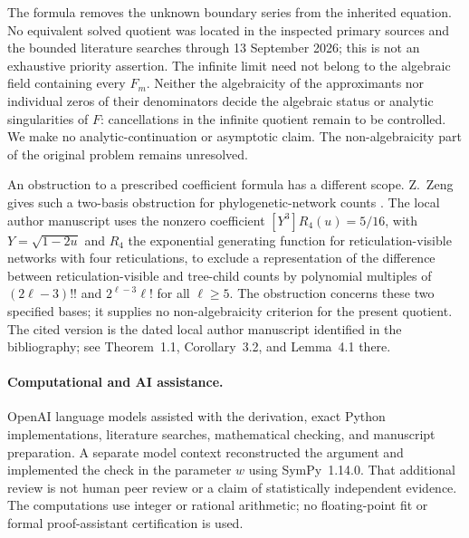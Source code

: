 \documentclass[11pt]{article}
\begin{document}
The formula removes the unknown boundary series from the inherited
equation. No equivalent solved quotient was located in the inspected
primary sources and the bounded literature searches through
13 September 2026; this is not an exhaustive priority assertion.
The infinite limit need not belong to the algebraic field containing
every $F_m$. Neither the algebraicity of the approximants nor individual
zeros of their denominators decide the algebraic status or analytic
singularities of $F$: cancellations in the infinite quotient remain to
be controlled. We make no analytic-continuation or asymptotic claim.
The non-algebraicity part of the original problem remains unresolved.

An obstruction to a prescribed coefficient formula has a different scope.
Z.~Zeng gives such a two-basis obstruction for phylogenetic-network counts
\cite{ZengSquareRoot}.
The local author manuscript uses the nonzero coefficient $[Y^3]R_4(u)=5/16$, with
$Y=\sqrt{1-2u}$ and $R_4$ the exponential generating function for
reticulation-visible networks with four reticulations, to exclude a
representation of the difference between
reticulation-visible and tree-child counts by polynomial multiples of
$(2\ell-3)!!$ and $2^{\ell-3}\ell!$ for all $\ell\ge5$.
The obstruction concerns these two specified bases; it supplies no
non-algebraicity criterion for the present quotient.
The cited version is the dated local author manuscript identified in
the bibliography; see Theorem~1.1, Corollary~3.2, and Lemma~4.1 there.

\paragraph{Computational and AI assistance.}
OpenAI language models assisted with the derivation, exact Python
implementations, literature searches, mathematical checking, and manuscript
preparation. A separate model context reconstructed the argument and
implemented the check in the parameter $w$ using SymPy~1.14.0.
That additional review is not human peer review or a claim of statistically
independent evidence. The computations use integer or rational arithmetic;
no floating-point fit or formal proof-assistant certification is used.



\end{document}
